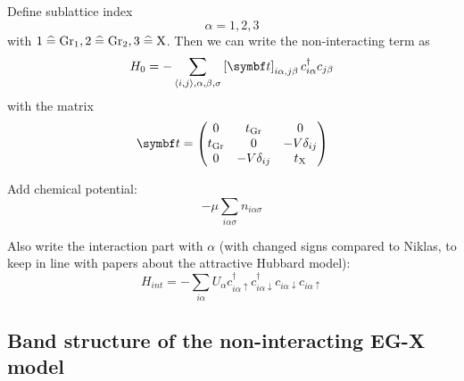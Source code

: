 \documentclass[../notes.tex]{subfiles}
\begin{document}

Define sublattice index
\begin{equation}
	\alpha = 1, 2, 3
\end{equation}
with \(1 \mathrel{\widehat{=}} \mathrm{Gr}_1, 2 \mathrel{\widehat{=}} \mathrm{Gr}_2, 3 \mathrel{\widehat{=}} \mathrm{X}\).
Then we can write the non-interacting term as
\begin{equation}
	H_0 = - \sum_{\langle i, j \rangle, \alpha, \beta, \sigma} \left[\mat{t} \right]_{i\alpha,j\beta} c_{i\alpha}^{\dagger} c_{j\beta}
\end{equation}
with the matrix
\begin{equation}
	\mat{t} = \begin{pmatrix}
		0 & t_{\mathrm{Gr}} & 0 \\
		t_{\mathrm{Gr}} & 0 & -V \delta_{ij} \\
		0 & -V \delta_{ij} & t_{\mathrm{X}} \\
	\end{pmatrix}
\end{equation}

Add chemical potential:
\begin{equation}
	-\mu \sum_{i \alpha \sigma} n_{i \alpha \sigma}
\end{equation}

Also write the interaction part with \(\alpha\) (with changed signs compared to Niklas, to keep in line with papers about the attractive Hubbard model):
\begin{equation}
	H_{int} = - \sum_{i \alpha} U_{\alpha} c_{i\alpha \uparrow}^{\dagger} c_{i\alpha \downarrow}^{\dagger} c_{i\alpha \downarrow} c_{i\alpha \uparrow}
\end{equation}


\subsection{Band structure of the non-interacting EG-X model}\label{subsec:band-structure-of-the-non-interacting-eg-x-model}
\end{document}
